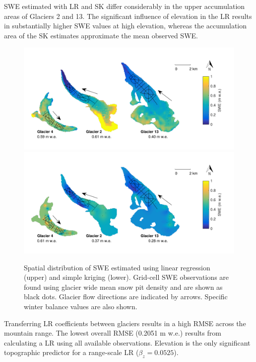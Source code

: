 \documentclass[twocolumn, letterpaper]{igs}
\begin{document}
SWE estimated with LR and SK differ considerably in the upper accumulation areas of Glaciers 2 and 13. The significant influence of elevation in the LR results in substantially higher SWE values at high elevation, whereas the accumulation area of the SK estimates approximate the mean observed SWE. 

\begin{figure}
	\centering
	\includegraphics[width =\textwidth]{LR_map.pdf}\\
		\vspace{-16 mm}
    \includegraphics[width =\textwidth]{SK_map.pdf}\\
	\caption{Spatial distribution of SWE estimated using linear regression (upper) and simple kriging (lower). Grid-cell SWE observations are found using glacier wide mean snow pit density and are shown as black dots. Glacier flow directions are indicated by arrows. Specific winter balance values are also shown.}
	\label{fig:LR_SK_map}
\end{figure}

Transferring LR coefficients between glaciers results in a high RMSE across the mountain range. The lowest overall RMSE (0.2051 m w.e.) results from calculating a LR using all available observations. Elevation is the only significant topographic predictor for a range-scale LR ($\beta_z=0.0525$).
\end{document}
